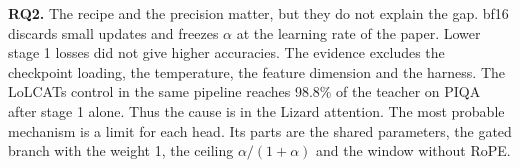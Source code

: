 \begin{finding}
\textbf{RQ2.} The recipe and the precision matter, but they do not explain the gap. bf16 discards small updates and freezes $\alpha$ at the learning rate of the paper. Lower stage 1 losses did not give higher accuracies. The evidence excludes the checkpoint loading, the temperature, the feature dimension and the harness. The LoLCATs control in the same pipeline reaches 98.8\% of the teacher on PIQA after stage 1 alone. Thus the cause is in the Lizard attention. The most probable mechanism is a limit for each head. Its parts are the shared parameters, the gated branch with the weight 1, the ceiling $\alpha/(1+\alpha)$ and the window without RoPE.
\end{finding}
